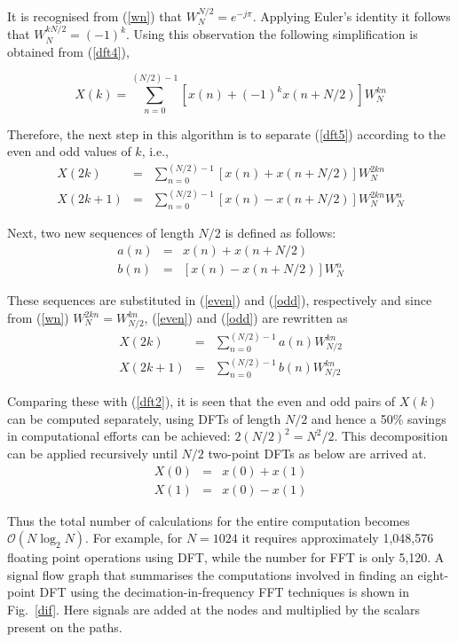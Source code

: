 \documentclass[a4paper,11pt]{report}
\begin{document}
It is recognised from (\ref{wn}) that $W_{N}^{N/2} = e^{-j\pi}$. Applying Euler's identity it follows that $W_{N}^{kN/2} = (-1)^{k}$. Using this observation the following simplification is obtained from (\ref{dft4}),

\begin{equation} \label{dft5}
X(k) = \sum_{n=0}^{(N/2) - 1} \left[ x(n) + (-1)^{k} x(n+N/2) \right] W_{N}^{kn}
\end{equation}

Therefore, the next step in this algorithm is to separate (\ref{dft5}) according to the even and odd values of $k$, i.e., 
\begin{eqnarray}
X(2k) & = & \sum_{n=0}^{(N/2) - 1} \left[ x(n) + x(n+N/2) \right] W_{N}^{2kn} \label{even}\\
X(2k+1) & = & \sum_{n=0}^{(N/2) - 1} \left[ x(n) - x(n+N/2) \right] W_{N}^{2kn} W_{N}^{n} \label{odd}
\end{eqnarray}

Next, two new sequences of length $N/2$ is defined as follows:
\begin{eqnarray}
a(n) & = & x(n) + x(n+N/2) \nonumber \\
b(n) & = & \left[ x(n) - x(n+N/2) \right] W_{N}^{n} \nonumber
\end{eqnarray}

These sequences are substituted in (\ref{even}) and (\ref{odd}), respectively and since from (\ref{wn}) $W_{N}^{2kn} = W_{N/2}^{kn}$, (\ref{even}) and (\ref{odd}) are rewritten as
\begin{eqnarray}
X(2k) & = & \sum_{n=0}^{(N/2) - 1} a(n) W_{N/2}^{kn} \label{even2} \\
X(2k+1) & = & \sum_{n=0}^{(N/2) - 1} b(n) W_{N/2}^{kn} \label{odd2}
\end{eqnarray}

Comparing these with (\ref{dft2}), it is seen that the even and odd pairs of $X(k)$ can be computed separately, using DFTs of length $N/2$ and hence a 50\% savings in computational efforts can be achieved: $2(N/2)^2=N^{2}/{2}$. This decomposition can be applied recursively until $N/2$ two-point DFTs as below are arrived at. 
\begin{eqnarray}
X(0) & = & x(0) + x(1) \\
X(1) & = & x(0) - x(1)
\end{eqnarray}

Thus the total number of calculations for the entire computation becomes ${\mathcal O}(N\log_{2} N)$. For example, for $N=1024$ it requires approximately 1,048,576 floating point operations using DFT, while the number for FFT is only 5,120. \cite{schilling} A signal flow graph that summarises the computations involved in finding an eight-point DFT using the decimation-in-frequency FFT techniques is shown in Fig.~\ref{dif}. Here signals are added at the nodes and multiplied by the scalars present on the paths. \cite{chapra}
\end{document}
